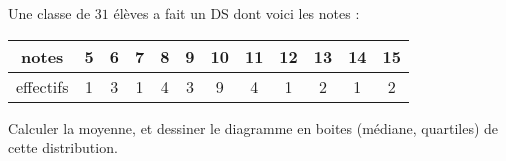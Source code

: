 
\begin{exercice}\label{exoSeconde-0032}

    Une classe de \( 31\) élèves a fait un DS dont voici les notes :

    \begin{center}
    \begin{tabular}{|c||c|c|c|c|c|c|c|c|c|c|c|}
        \hline
        notes&5&6&7&8&9&10&11&12&13&14&15\\
        \hline
        effectifs&1&3&1&4&3&9&4&1&2&1&2\\
        \hline
    \end{tabular}
    \end{center}

    Calculer la moyenne, et dessiner le diagramme en boites (médiane, quartiles) de cette distribution.


\end{exercice}

